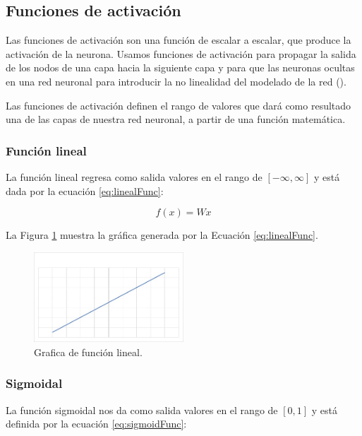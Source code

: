 \subsection{Funciones de activación}

Las funciones de activación son una función de escalar a escalar, que produce la activación de la neurona. Usamos funciones de activación para propagar la salida de los nodos de una capa hacia la siguiente capa y para que las neuronas ocultas en una red neuronal para introducir la no linealidad del modelado de la red (\cite{patterson2017deep}).


Las funciones de activación definen el rango de valores que dará como resultado una de las capas de nuestra red neuronal, a partir de una función matemática.

\subsubsection{Función lineal}

La función lineal regresa como salida valores en el rango de $[-\infty,\infty]$ y está dada por la ecuación \ref{eq:linealFunc}:

\begin{equation}
\label{eq:linealFunc}
    f(x) = Wx
\end{equation}

La Figura \ref{fig:graficaLineal} muestra la gráfica generada por la Ecuación \ref{eq:linealFunc}.

\begin{figure}[H]
    \centering
    \includegraphics[width=0.5\textwidth]{MarcoTeorico/imgs/GraficaLineal.jpg}
    \caption{Grafica de función lineal.}
    \label{fig:graficaLineal}
\end{figure}

\subsubsection{Sigmoidal}

La función sigmoidal nos da como salida valores en el rango de $[0,1]$ y está definida por la ecuación \ref{eq:sigmoidFunc}:

